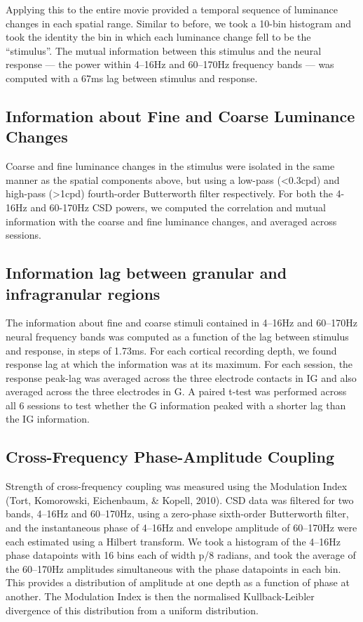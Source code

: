 \documentclass{article}
\begin{document}
Applying this to the entire movie provided a temporal sequence of luminance changes in each spatial range. Similar to before, we took a 10-bin histogram and took the identity the bin in which each luminance change fell to be the ``stimulus''. The mutual information between this stimulus and the neural response --- the power within 4--16Hz and 60--170Hz frequency bands --- was computed with a 67ms lag between stimulus and response.

\subsection{Information about Fine and Coarse Luminance Changes}
Coarse and fine luminance changes in the stimulus were isolated in the same manner as the spatial components above, but using a low-pass ({\textless}0.3cpd) and high-pass ({\textgreater}1cpd) fourth-order Butterworth filter respectively. For both the 4-16Hz and 60-170Hz CSD powers, we computed the correlation and mutual information with the coarse and fine luminance changes, and averaged across sessions.

\subsection[Information lag between granular and infragranular regions]{Information lag between granular and infragranular regions}
The information about fine and coarse stimuli contained in 4--16Hz and 60--170Hz neural frequency bands was computed as a function of the lag between stimulus and response, in steps of 1.73ms. For each cortical recording depth, we found response lag at which the information was at its maximum. For each session, the response peak-lag was averaged across the three electrode contacts in IG and also averaged across the three electrodes in G. A paired t-test was performed across all 6 sessions to test whether the G information peaked with a shorter lag than the IG information.

\subsection[Cross{}-Frequency Phase{}-Amplitude Coupling]{Cross-Frequency Phase-Amplitude Coupling}
Strength of cross-frequency coupling was measured using the Modulation Index (Tort, Komorowski, Eichenbaum, \& Kopell, 2010). CSD data was filtered for two bands, 4--16Hz and 60--170Hz, using a zero-phase sixth-order Butterworth filter, and the instantaneous phase of 4--16Hz and envelope amplitude of 60--170Hz were each estimated using a Hilbert transform. We took a histogram of the 4--16Hz phase datapoints with 16 bins each of width \textgreek{p/8 }radians, and took the average of the 60--170Hz amplitudes simultaneous with the phase datapoints in each bin. This provides a distribution of amplitude at one depth as a function of phase at another. The Modulation Index is then the normalised Kullback-Leibler divergence of this distribution from a uniform distribution.
\end{document}
